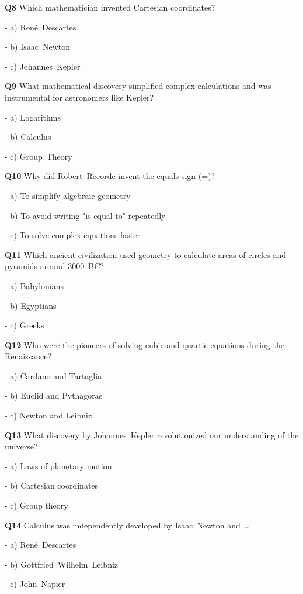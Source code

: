 \textbf{Q8} Which mathematician invented Cartesian coordinates?\par
\quad - a) René Descartes\par
\quad - b) Isaac Newton\par
\quad - c) Johannes Kepler\par

\textbf{Q9} What mathematical discovery simplified complex calculations and was instrumental for astronomers like Kepler?\par
\quad - a) Logarithms\par
\quad - b) Calculus\par
\quad - c) Group Theory\par

\textbf{Q10} Why did Robert Recorde invent the equals sign (=)?\par
\quad - a) To simplify algebraic geometry\par
\quad - b) To avoid writing "is equal to" repeatedly\par
\quad - c) To solve complex equations faster\par

\textbf{Q11} Which ancient civilization used geometry to calculate areas of circles and pyramids around 3000 BC?\par
\quad - a) Babylonians\par
\quad - b) Egyptians\par
\quad - c) Greeks\par

\textbf{Q12} Who were the pioneers of solving cubic and quartic equations during the Renaissance?\par
\quad - a) Cardano and Tartaglia\par
\quad - b) Euclid and Pythagoras\par
\quad - c) Newton and Leibniz\par

\textbf{Q13} What discovery by Johannes Kepler revolutionized our understanding of the universe?\par
\quad - a) Laws of planetary motion\par
\quad - b) Cartesian coordinates\par
\quad - c) Group theory\par

\textbf{Q14} Calculus was independently developed by Isaac Newton and …\par
\quad - a) René Descartes\par
\quad - b) Gottfried Wilhelm Leibniz\par
\quad - c) John Napier\par

